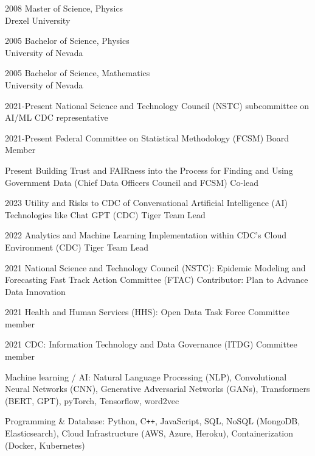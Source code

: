 \documentclass[]{scrartcl}
\begin{document}
\begin{cleanCV}
\WorkExperience
{2008}
{Master of Science, Physics}
{\\Drexel University}

\WorkExperience
{2005}
{Bachelor of Science, Physics}
{\\University of Nevada}

\WorkExperience
{2005}
{Bachelor of Science, Mathematics}
{\\University of Nevada}


\WorkExperienceX
{2021-Present}
{National Science and Technology Council (NSTC) subcommittee on AI/ML}
{CDC representative}

\WorkExperienceX
{2021-Present}
{Federal Committee on Statistical Methodology (FCSM)}
{Board Member}

\WorkExperienceX
{Present}
{Building Trust and FAIRness into the Process  for Finding and Using Government Data (Chief Data Officers Council and FCSM)}
{Co-lead}

\WorkExperienceX
{2023}
{Utility and Risks to CDC of Conversational Artificial Intelligence (AI) Technologies like Chat GPT (CDC)}
{Tiger Team Lead}

\WorkExperienceX
{2022}
{Analytics and Machine Learning Implementation within CDC's Cloud Environment (CDC)}
{Tiger Team Lead}

\WorkExperienceX
{2021}
{National Science and Technology Council (NSTC): Epidemic Modeling and Forecasting Fast Track Action Committee (FTAC)}
{Contributor: Plan to Advance Data Innovation}

\WorkExperienceX
{2021}
{Health and Human Services (HHS): Open Data Task Force}
{Committee member}

\WorkExperienceX
{2021}
{CDC: Information Technology and Data Governance (ITDG)}
{Committee member}


\newpage


\WorkExperience
{ }
{Machine learning / AI: }
{Natural Language Processing (NLP), Convolutional Neural Networks (CNN), Generative Adversarial Networks (GANs), Transformers (BERT, GPT), pyTorch, Tensorflow, word2vec}

\WorkExperience
{ }
{Programming \& Database: }
{Python, C\texttt{++}, JavaScript, SQL, NoSQL (MongoDB, Elasticsearch), Cloud Infrastructure (AWS, Azure, Heroku), Containerization (Docker, Kubernetes)}


\end{cleanCV}
\end{document}
